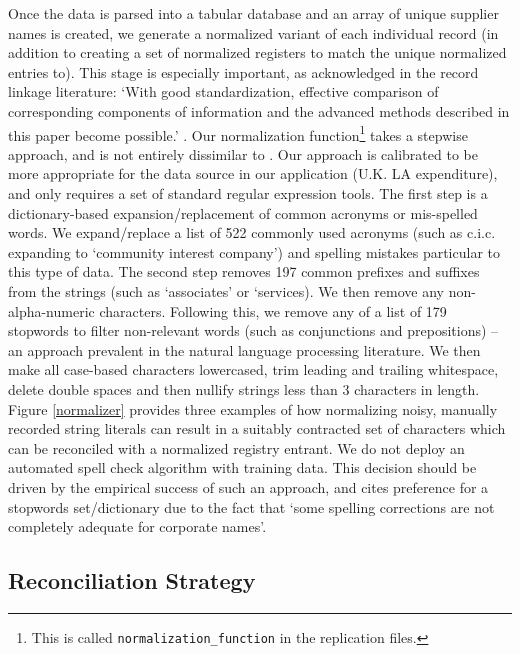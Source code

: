 \documentclass[11pt]{article}
\begin{document}
Once the data is parsed into a tabular database and an array of unique supplier names is created, we generate a normalized variant of each individual record (in addition to creating a set of normalized registers to match the unique normalized entries to). This stage is especially important, as acknowledged in the record linkage literature: `With good standardization, effective comparison of corresponding components of information and the advanced methods described in this paper become possible.' \citep{Porter97approximatestring}. Our normalization function\footnote{This is called \texttt{normalization\_function} in the replication files.} takes a stepwise approach, and is not entirely dissimilar to \cite{corfu2015}. Our approach is calibrated to be more appropriate for the data source in our application (U.K. LA expenditure), and only requires a set of standard regular expression tools. The first step is a dictionary-based expansion/replacement of common acronyms or mis-spelled words. We expand/replace a list of 522 commonly used acronyms (such as c.i.c. expanding to `community interest company') and spelling mistakes particular to this type of data. The second step removes 197 common prefixes and suffixes from the strings (such as `associates' or `services). We then remove any non-alpha-numeric characters. Following this, we remove any of a list of 179 stopwords to filter non-relevant words (such as conjunctions and prepositions) -- an approach prevalent in the natural language processing literature. We then make all case-based characters lowercased, trim leading and trailing whitespace, delete double spaces and then nullify strings less than 3 characters in length. Figure \ref{normalizer} provides three examples of how normalizing noisy, manually recorded string literals can result in a suitably contracted set of characters which can be reconciled with a normalized registry entrant. We do not deploy an automated spell check algorithm with training data. This decision should be driven by the empirical success of such an approach, and \cite{corfu2015} cites preference for a stopwords set/dictionary due to the fact that `some spelling corrections are not completely adequate for corporate names'.

\subsection{Reconciliation Strategy}\label{stringmatching}
\end{document}

